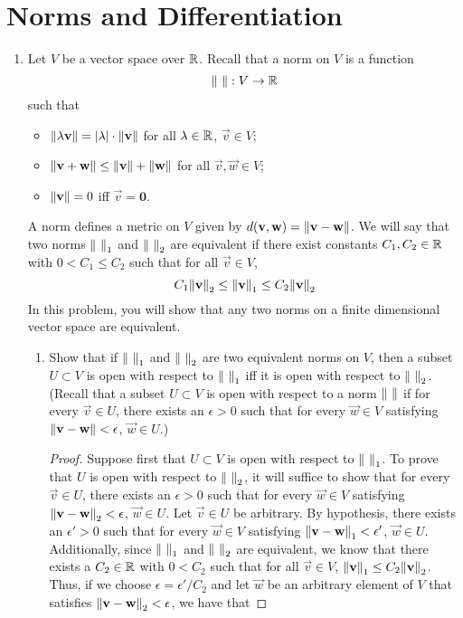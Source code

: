 \documentclass[../psets.tex]{subfiles}
\begin{document}
\section{Norms and Differentiation}
\begin{enumerate}
    \item {}Let $V$ be a vector space over $\mathbb{R}$. Recall that a norm on $V$ is a function
    \begin{equation*}
        \norm{\ }:V\to\mathbb{R}
    \end{equation*}
    such that
    \begin{itemize}
        \item $\norm{\lambda\mathbf{v}}=|\lambda|\cdot\norm{\mathbf{v}}$ for all $\lambda\in\mathbb{R}$, $\vec{v}\in V$;
        \item $\norm{\mathbf{v}+\mathbf{w}}\leq\norm{\mathbf{v}}+\norm{\mathbf{w}}$ for all $\vec{v},\vec{w}\in V$;
        \item $\norm{\mathbf{v}}=0$ iff $\vec{v}=\bm{0}$.
    \end{itemize}
    A norm defines a metric on $V$ given by $d(\mathbf{v},\mathbf{w})=\norm{\mathbf{v}-\mathbf{w}}$. We will say that two norms $\norm{\ }_1$ and $\norm{\ }_2$ are equivalent if there exist constants $C_1,C_2\in\mathbb{R}$ with $0<C_1\leq C_2$ such that for all $\vec{v}\in V$,
    \begin{equation*}
        C_1\norm{\mathbf{v}}_2 \leq \norm{\mathbf{v}}_1 \leq C_2\norm{\mathbf{v}}_2
    \end{equation*}
    In this problem, you will show that any two norms on a finite dimensional vector space are equivalent.
    \begin{enumerate}
        \item Show that if $\norm{\ }_1$ and $\norm{\ }_2$ are two equivalent norms on $V$, then a subset $U\subset V$ is open with respect to $\norm{\ }_1$ iff it is open with respect to $\norm{\ }_2$. (Recall that a subset $U\subset V$ is open with respect to a norm $\norm{\ }$ if for every $\vec{v}\in U$, there exists an $\epsilon>0$ such that for every $\vec{w}\in V$ satisfying $\norm{\mathbf{v}-\mathbf{w}}<\epsilon$, $\vec{w}\in U$.)
        \begin{proof}
            Suppose first that $U\subset V$ is open with respect to $\norm{\ }_1$. To prove that $U$ is open with respect to $\norm{\ }_2$, it will suffice to show that for every $\vec{v}\in U$, there exists an $\epsilon>0$ such that for every $\vec{w}\in V$ satisfying $\norm{\mathbf{v}-\mathbf{w}}_2<\epsilon$, $\vec{w}\in U$. Let $\vec{v}\in U$ be arbitrary. By hypothesis, there exists an $\epsilon'>0$ such that for every $\vec{w}\in V$ satisfying $\norm{\mathbf{v}-\mathbf{w}}_1<\epsilon'$, $\vec{w}\in U$. Additionally, since $\norm{\ }_1$ and $\norm{\ }_2$ are equivalent, we know that there exists a $C_2\in\mathbb{R}$ with $0<C_2$ such that for all $\vec{v}\in V$, $\norm{\mathbf{v}}_1\leq C_2\norm{\mathbf{v}}_2$. Thus, if we choose $\epsilon=\epsilon'/C_2$ and let $\vec{w}$ be an arbitrary element of $V$ that satisfies $\norm{\mathbf{v}-\mathbf{w}}_2<\epsilon$, we have that

\end{proof}
\end{enumerate}
\end{enumerate}
\end{document}
